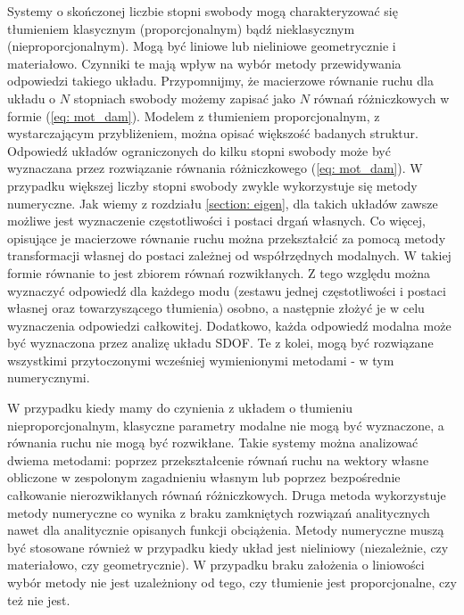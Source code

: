Systemy o skończonej liczbie stopni swobody mogą charakteryzować się tłumieniem klasycznym (proporcjonalnym) bądź nieklasycznym (nieproporcjonalnym). Mogą być liniowe lub nieliniowe geometrycznie i materiałowo. Czynniki te mają wpływ na wybór metody przewidywania odpowiedzi takiego układu. Przypomnijmy, że macierzowe równanie ruchu dla układu o $N$ stopniach swobody możemy zapisać jako $N$ równań różniczkowych w formie (\ref{eq: mot_dam}).
 Modelem z tłumieniem proporcjonalnym, z wystarczającym przybliżeniem, można opisać większość badanych struktur. Odpowiedź układów ograniczonych do kilku stopni swobody może być wyznaczana przez rozwiązanie równania różniczkowego (\ref{eq: mot_dam}). W przypadku większej liczby stopni swobody zwykle wykorzystuje się metody numeryczne. Jak wiemy z rozdziału \ref{section: eigen}, dla takich układów zawsze możliwe jest wyznaczenie częstotliwości i postaci drgań własnych. Co więcej, opisujące je macierzowe równanie ruchu można przekształcić za pomocą metody transformacji własnej do postaci zależnej od współrzędnych modalnych. W takiej formie równanie to jest zbiorem równań rozwikłanych. Z tego względu można wyznaczyć odpowiedź dla każdego modu (zestawu jednej częstotliwości i postaci własnej oraz towarzyszącego tłumienia) osobno, a następnie złożyć je w celu wyznaczenia odpowiedzi całkowitej. Dodatkowo, każda odpowiedź modalna może być wyznaczona przez analizę układu SDOF. Te z kolei, mogą być rozwiązane wszystkimi przytoczonymi wcześniej wymienionymi metodami - w tym numerycznymi.
 
 W przypadku kiedy mamy do czynienia z układem o tłumieniu nieproporcjonalnym, klasyczne parametry modalne nie mogą być wyznaczone, a równania ruchu nie mogą być rozwikłane. Takie systemy można analizować dwiema metodami: poprzez przekształcenie równań ruchu na wektory własne obliczone w zespolonym zagadnieniu własnym lub poprzez bezpośrednie całkowanie nierozwikłanych równań różniczkowych. Druga metoda wykorzystuje metody numeryczne co wynika z braku zamkniętych rozwiązań analitycznych nawet dla analitycznie opisanych funkcji obciążenia. Metody numeryczne muszą być stosowane również w przypadku kiedy układ jest nieliniowy (niezależnie, czy materiałowo, czy geometrycznie). W przypadku braku założenia o liniowości wybór metody nie jest uzależniony od tego, czy tłumienie jest proporcjonalne, czy też nie jest.
 

